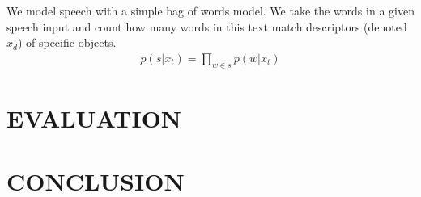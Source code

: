 \documentclass[letterpaper, 10 pt, conference]{ieeeconf}
\newcommand{\menote}[1]{\textcolor{Red}{\textbf{ME: #1}}}
\begin{document}


We model speech with a simple bag of words model. We take the words in a given speech input and count how many words in this text match descriptors (denoted  $x_d$) of specific objects.
\begin{align}
p(s |x_t) = \displaystyle \prod_{w \in s} p(w | x_t)
\end{align}


\section{EVALUATION}

\section{CONCLUSION}




\end{document}

